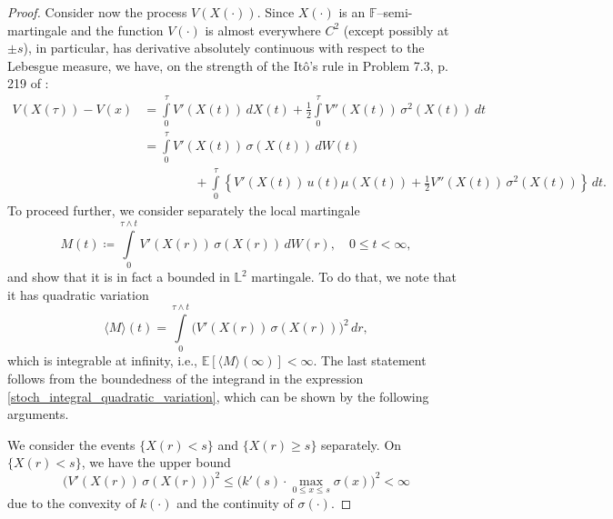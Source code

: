 \documentclass[11pt,tbtags,reqno]{article}
\theoremstyle{definition}
\numberwithin{equation}{section}
\theoremstyle{definition}
\begin{document}
\begin{proof}
Consider now the process $V(X(\cdot))$. Since $X(\cdot)$ is an $\mathbb{F}$--semi-martingale and the function $V(\cdot)$ is almost everywhere $C^2$ (except possibly at $\pm s$), in particular, has derivative absolutely continuous with respect to the Lebesgue measure, we have, on the strength of the  Itô's rule in Problem 7.3, p. 219 of \cite{BMSC}:
\begin{equation}\label{Ito}
    \begin{split}
        V(X(\tau)) - V(x) 
        &= 
        \int\limits_{0}^{\tau} V'(X(t)) \, dX(t) + \frac{1}{2}\int\limits_{0}^{\tau} V''(X(t))\, \sigma^2(X(t))\, dt \\
        &=
        \int\limits_{0}^{\tau} V'(X(t))\, \sigma(X(t)) \, dW(t) \\ 
        & \quad \quad \quad \quad + 
        \int\limits_{0}^{\tau} \left\{  V'(X(t))\, u(t)\mu(X(t))+ \frac{1}{2} V''(X(t))\, \sigma^2(X(t))\right\}\, dt.
        \end{split}
\end{equation}
To proceed further, we consider separately the local martingale 
\begin{equation}
    M(t) \coloneqq \int\limits_{0}^{\tau \wedge t} V'(X(r))\, \sigma(X(r)) \, dW(r), \quad 0 \le t < \infty,
\end{equation}
and show that it is in fact a bounded in $\mathbb{L}^2$ martingale. To do that, we note that it has quadratic variation 
\begin{equation}\label{stoch_integral_quadratic_variation}
    \langle M \rangle (t)=
        \int\limits_{0}^{\tau \wedge t} \Big(V'(X(r))\, \sigma(X(r))\Big)^2 \, dr,
\end{equation}
which is integrable at infinity, i.e., $\mathbb{E}[\langle M \rangle(\infty)] < \infty$. The last statement follows from the boundedness of the integrand in the expression \eqref{stoch_integral_quadratic_variation}, which can be shown by the following arguments.

We consider the events $\{X(r) < s\}$ and $\{X(r) \ge s\}$ separately. On $\{X(r) < s\}$, we have the upper bound
\begin{equation}\label{first_upper_bound}
    \Big(V'(X(r))\, \sigma(X(r))\Big)^2 \le \Big(k'(s) \cdot \max\limits_{0 \le x \le s} \sigma(x)\Big)^2 < \infty
\end{equation}
due to the convexity of $k(\cdot)$ and the continuity of $\sigma(\cdot)$. 


\end{proof}
\end{document}
